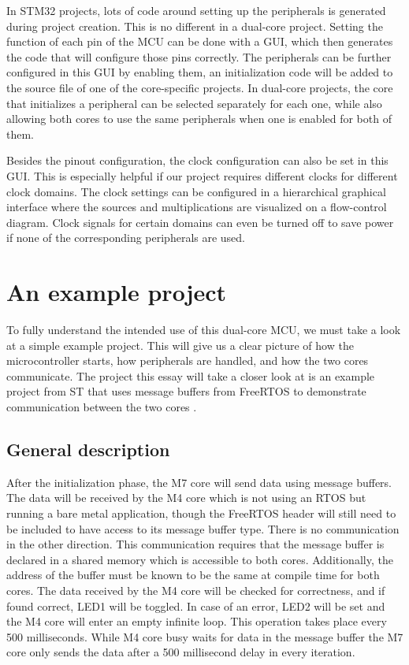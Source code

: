 In STM32 projects, lots of code around setting up the peripherals is generated during project creation. This is no different in a dual-core project. Setting the function of each pin of the MCU can be done with a GUI, which then generates the code that will configure those pins correctly. The peripherals can be further configured in this GUI by enabling them, an initialization code will be added to the  source file of one of the core-specific projects. In dual-core projects, the core that initializes a peripheral can be selected separately for each one, while also allowing both cores to use the same peripherals when one is enabled for both of them.

Besides the pinout configuration, the clock configuration can also be set in this GUI. This is especially helpful if our project requires different clocks for different clock domains. The clock settings can be configured in a hierarchical graphical interface where the sources and multiplications are visualized on a flow-control diagram. Clock signals for certain domains can even be turned off to save power if none of the corresponding peripherals are used.

\section{An example project}

To fully understand the intended use of this dual-core MCU, we must take a look at a simple example project. This will give us a clear picture of how the microcontroller starts, how peripherals are handled, and how the two cores communicate. The project this essay will take a closer look at is an example project from ST that uses message buffers from FreeRTOS to demonstrate communication between the two cores \cite{CDemo}.

\subsection{General description}

After the initialization phase, the M7 core will send data using message buffers. The data will be received by the M4 core which is not using an RTOS but running a bare metal application, though the FreeRTOS header will still need to be included to have access to its message buffer type. There is no communication in the other direction. This communication requires that the message buffer is declared in a shared memory which is accessible to both cores. Additionally, the address of the buffer must be known to be the same at compile time for both cores. The data received by the M4 core will be checked for correctness, and if found correct, LED1 will be toggled. In case of an error, LED2 will be set and the M4 core will enter an empty infinite loop. This operation takes place every 500 milliseconds. While M4 core busy waits for data in the message buffer the M7 core only sends the data after a 500 millisecond delay in every iteration.

